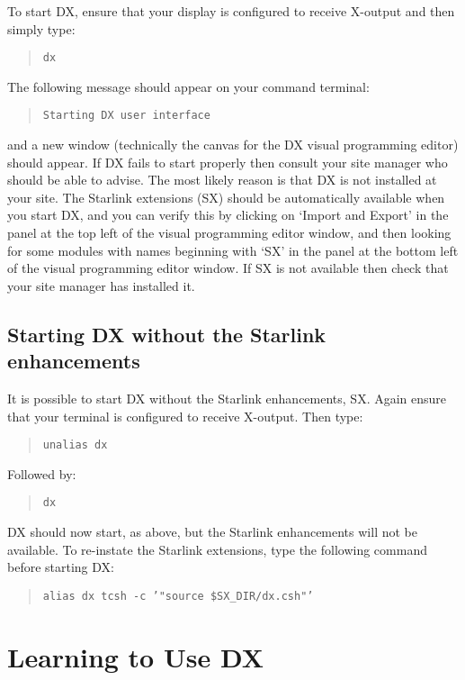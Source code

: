 To start DX, ensure that your display is configured to receive X-output
and then simply type:

\begin{quote}
{\tt dx}
\end{quote}

The following message should appear on your command terminal:

\begin{quote}
{\tt Starting DX user interface}
\end{quote}

and a new window (technically the canvas for the DX visual programming
editor) should appear. If DX fails to start properly then consult your
site manager who should be able to advise. The most likely reason is
that DX is not installed at your site. The Starlink extensions (SX)
should be automatically available when you start DX, and you can verify
this by clicking on `Import and Export' in the panel at the top left of
the visual programming editor window, and then looking for some modules
with names beginning with `SX' in the panel at the bottom left of the
visual programming editor window. If SX is not available then check that
your site manager has installed it.

\subsection{Starting DX without the Starlink enhancements}

It is possible to start DX without the Starlink enhancements, SX. Again
ensure that your terminal is configured to receive X-output. Then
type:

\begin{quote}
{\tt unalias \quad dx}
\end{quote}

Followed by:

\begin{quote}
{\tt dx}
\end{quote}

DX should now start, as above, but the Starlink enhancements will not
be available.  To re-instate the Starlink extensions, type the following
command before starting DX:

\begin{quote}
{\tt alias dx tcsh -c '"source \$SX\_DIR/dx.csh"'}
\end{quote}

\section{Learning to Use DX  }

